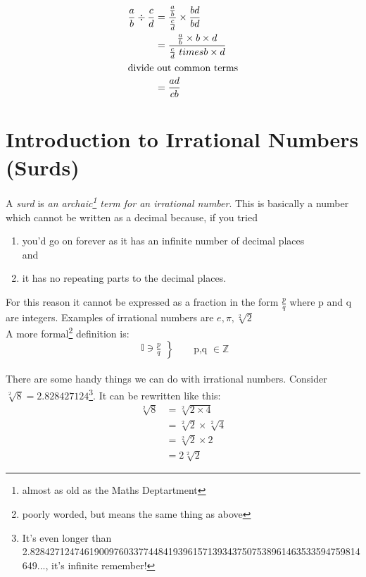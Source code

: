 \begin{align}
  \frac{a}{b} \div \frac{c}{d} & = \frac{ \frac{a}{b} }{ \frac{c}{d}} \times
  \frac{bd}{bd} \\
   & = \frac{\frac{a}{b}\times b \times d}{\frac{c}{d} \ times b \times d} \\
  \intertext{divide out common terms}
   & = \frac{ad}{cb}
\end{align}

\section{Introduction to Irrational Numbers (Surds)}
\label{sec:IntroductionToIrrationalNumbers}
A \emph{surd} is \emph{an archaic\footnote{almost as old as the Maths
Deptartment} term for an irrational number}. This is basically a number which
cannot be written as a decimal because, if you tried
\begin{enumerate}
  \item you'd go on forever as it has an infinite number of decimal places\\
  and
  \item it has no repeating parts to the decimal places.
\end{enumerate}
For this reason it cannot be expressed as a fraction in the form $\frac{p}{q}$
where p and q are integers.
Examples of irrational numbers are $e, \pi, \sqrt[2]{2}$
\\
A more formal\footnote{poorly worded, but means the same thing as above}
definition is:
\begin{equation*}
\left.\begin{aligned}
  \mathbb{I} \ni \frac{p}{q}
\end{aligned}
\right\} 
\qquad \text{{p,q $\in \mathbb{Z}$}}
\end{equation*}
\\
There are some handy things we can do with irrational numbers. Consider
$\sqrt[2]{8} =
2.828427124$\footnote{It's even longer than
2.8284271247461900976033774484193961571393437507538961463533594759814649...,
it's infinite remember!}. It can be rewritten like this:
\begin{align}
  \sqrt[2]{8} & = 
    \sqrt[2]{2 \times 4} \\
    & = \sqrt[2]{2} \times \sqrt[2]{4} \\
    & = \sqrt[2]{2} \times 2 \\
    & = 2\sqrt[2]{2}
\end{align}

